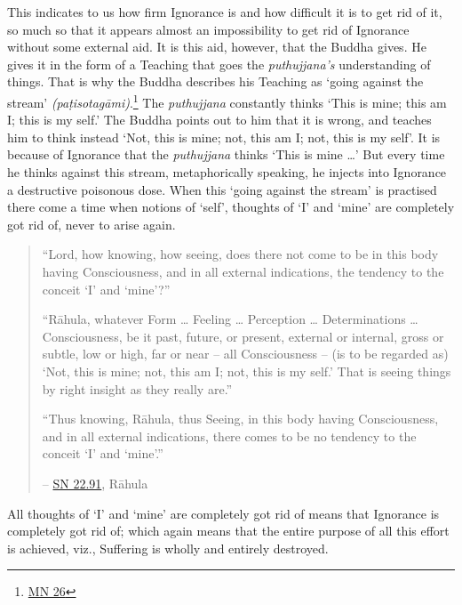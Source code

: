 This indicates to us how firm Ignorance is and how difficult it is to get rid of it, so much so that it appears almost an impossibility to get rid of Ignorance without some external aid. It is this aid, however, that the Buddha gives. He gives it in the form of a Teaching that goes  the \emph{puthujjana's} understanding of things. That is why the Buddha describes his Teaching as `going against the stream' \emph{(paṭisotagāmi)}.\footnote{\href{https://suttacentral.net/mn26/en/bodhi}{MN 26}} The \emph{puthujjana} constantly thinks `This is mine; this am I; this is my self.' The Buddha points out to him that it is wrong, and teaches him to think instead `Not, this is mine; not, this am I; not, this is my self'. It is because of Ignorance that the \emph{puthujjana} thinks `This is mine \ldots\hspace{0pt}' But every time he thinks against this stream, metaphorically speaking, he injects into Ignorance a destructive poisonous dose. When this `going against the stream' is practised there come a time when  notions of `self',  thoughts of `I' and `mine' are completely got rid of, never to arise again.

\begin{quote}
``Lord, how knowing, how seeing, does there not come to be in this body having Consciousness, and in all external indications, the tendency to the conceit `I' and `mine'?''

``Rāhula, whatever Form \ldots\hspace{0pt} Feeling \ldots\hspace{0pt} Perception \ldots\hspace{0pt} Determinations \ldots\hspace{0pt} Consciousness, be it past, future, or present, external or internal, gross or subtle, low or high, far or near -- all Consciousness -- (is to be regarded as) `Not, this is mine; not, this am I; not, this is my self.' That is seeing things by right insight as they really are.''

``Thus knowing, Rāhula, thus Seeing, in this body having Consciousness, and in all external indications, there comes to be no tendency to the conceit `I' and `mine'.''

 -- \href{https://suttacentral.net/sn22.91/en/bodhi}{SN 22.91}, Rāhula
\end{quote}

All thoughts of `I' and `mine' are completely got rid of means that Ignorance is completely got rid of; which again means that the entire purpose of all this effort is achieved, viz., Suffering is wholly and entirely destroyed.

